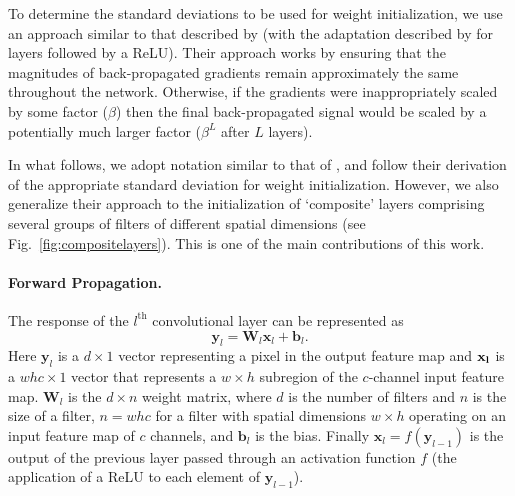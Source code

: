 \documentclass[thesis]{subfiles}
\begin{document}
    To determine the standard deviations to be used for weight initialization, we use an approach similar to that described by \citet{glorot2010understanding} (with the adaptation described by \citet{journals/corr/HeZR015} for layers followed by a ReLU). Their approach works by ensuring that the magnitudes of back-propagated gradients remain approximately the same throughout the network. Otherwise, if the gradients were inappropriately scaled by some factor (\eg $\beta$) then the final back-propagated signal would be scaled by a potentially much larger factor ($\beta^L$ after $L$ layers).
    
    In what follows, we adopt notation similar to that of \citet{journals/corr/HeZR015}, and follow their derivation of the appropriate standard deviation for weight initialization. However, we also generalize their approach to the initialization of `composite' layers comprising several groups of filters of different spatial dimensions (see Fig.~\ref{fig:compositelayers}). This is one of the main contributions of this work.
    
    \paragraph{Forward Propagation.}
    The response of the $l^\text{th}$ convolutional layer can be represented as
    \begin{equation}
    \mathbf{y}_l =\mathbf{W}_l \mathbf{x}_l + \mathbf{b}_l.
    \end{equation}
    Here $\mathbf{y}_l$ is a $d \times 1$ vector representing a pixel in the output feature map and $\bf x_l$ is a $ w h c \times 1$ vector that represents a $w \times h$ subregion of the $c$-channel input feature map. $\mathbf{W}_l$ is the $d\times n$ weight matrix, where $d$ is the number of filters and $n$ is the size of a filter, \ie $n = w h c$ for a filter with spatial dimensions $w \times h$ operating on an input feature map of $c$ channels, and $\mathbf{b}_l$ is the bias. Finally $\mathbf{x}_l = f(\mathbf{y}_{l-1})$ is the output of the previous layer passed through an activation function $f$ (\eg the application of a ReLU to each element of $\mathbf{y}_{l-1}$).
    
\end{document}
